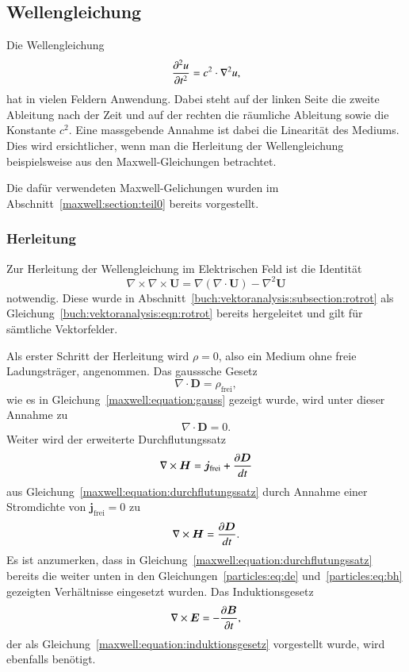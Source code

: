 \subsection{Wellengleichung}\label{particles:section:lin-medium:wellengleichung}
Die Wellengleichung 
\begin{equation}
    \frac{\d^2 u}{\d t^2} = c^2 \cdot \nabla^2 u, \label{particles:eq:wellengleichung}
\end{equation}
hat in vielen Feldern Anwendung.
Dabei steht auf der linken Seite die zweite Ableitung nach der Zeit und auf der rechten die räumliche Ableitung sowie die Konstante $c^2$.
Eine massgebende Annahme ist dabei die Linearität des Mediums.
Dies wird ersichtlicher, wenn man die Herleitung der Wellengleichung beispielsweise aus den Maxwell-Gleichungen betrachtet.

Die dafür verwendeten Maxwell-Gelichungen wurden im Abschnitt~\ref{maxwell:section:teil0} bereits vorgestellt.


\subsubsection{Herleitung}
Zur Herleitung der Wellengleichung im Elektrischen Feld ist die Identität
\begin{equation}
    \nabla \times \nabla \times \boldsymbol{U} = \nabla(\nabla \cdot \boldsymbol{U}) - \nabla^2 \boldsymbol{U}\label{particles:eq:rot-identity}
\end{equation}
notwendig. 
Diese wurde in Abschnitt~\ref{buch:vektoranalysis:subsection:rotrot} als Gleichung~\ref{buch:vektoranalysis:eqn:rotrot} bereits hergeleitet und gilt für sämtliche Vektorfelder.

Als erster Schritt der Herleitung wird $\rho = 0$, also ein Medium ohne freie Ladungsträger, angenommen.
Das gausssche Gesetz
\[
    \nabla \cdot \boldsymbol{D} = \rho_\text{frei},
\]
wie es in Gleichung~\ref{maxwell:equation:gauss} gezeigt wurde, wird unter dieser Annahme zu
\begin{equation}
    \nabla \cdot \boldsymbol{D} = 0.\label{particles:eq:gauss}
\end{equation}
Weiter wird der erweiterte Durchflutungssatz
\[
    \nabla \times \boldsymbol{H} = \boldsymbol{j}_\text{frei} + \frac{\d \boldsymbol{D}}{dt}
\]
aus Gleichung~\ref{maxwell:equation:durchflutungssatz} durch Annahme einer Stromdichte von $\boldsymbol{j}_\text{frei} = 0$ zu
\begin{equation}
    \nabla \times \boldsymbol{H} = \frac{\d \boldsymbol{D}}{dt}.\label{particles:eq:durchflutungssatz}
\end{equation}
Es ist anzumerken, dass in Gleichung~\ref{maxwell:equation:durchflutungssatz} bereits die weiter unten in den Gleichungen~\ref{particles:eq:de} und~\ref{particles:eq:bh} gezeigten Verhältnisse eingesetzt wurden.
Das Induktionsgesetz
\begin{equation}
    \nabla \times \boldsymbol{E} = -\frac{\d \boldsymbol{B}}{\d t}\label{particles:eq:induktionsgesetz},
\end{equation}
der als Gleichung~\ref{maxwell:equation:induktionsgesetz} vorgestellt wurde, wird ebenfalls benötigt.

